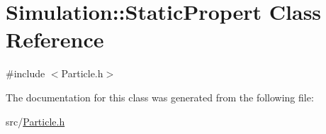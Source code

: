 \hypertarget{classSimulation_1_1StaticPropert}{\section{Simulation\-:\-:Static\-Propert Class Reference}
\label{classSimulation_1_1StaticPropert}
}


{\ttfamily \#include $<$Particle.\-h$>$}



The documentation for this class was generated from the following file\-:\begin{DoxyCompactItemize}
\item 
src/\hyperlink{Particle_8h}{Particle.\-h}\end{DoxyCompactItemize}

